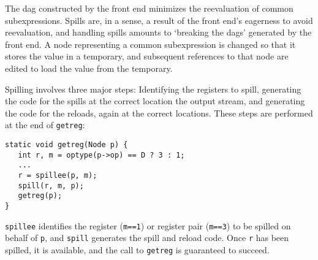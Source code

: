 The dag constructed by the front end minimizes the reevaluation of
common subexpressions. Spills are, in a sense,
a result of the front end's eagerness to avoid
reevaluation, and handling spills amounts to
`breaking the dags' generated by the front end.
A node representing a common subexpression is changed
so that it stores the value in a temporary, and
subsequent references to that node are edited
to load the value from the temporary.

Spilling involves three major steps:
Identifying the registers to spill,
generating the code for the spills at the correct
location the output stream, and
generating the code for the reloads, again at the correct locations.
These steps are performed at the end of \verb|getreg|:
\begin{verbatim}
static void getreg(Node p) {
   int r, m = optype(p->op) == D ? 3 : 1;
   ...
   r = spillee(p, m);
   spill(r, m, p);
   getreg(p);
}
\end{verbatim}
\verb|spillee| identifies the register (\verb|m==1|) or register pair (\verb|m==3|)
to be spilled on behalf of \verb|p|,
and \verb|spill| generates the spill and reload code.
Once \verb|r| has been spilled,
it is available,
and the call to \verb|getreg| is guaranteed to succeed.

